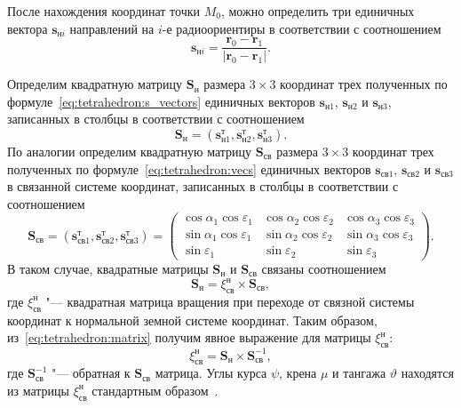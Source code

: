 \documentclass[../main.tex]{subfiles}
\begin{document}
После нахождения координат точки $M_0$, можно определить три единичных вектора $\mathbf{s}_{\text{н}i}$ направлений на $i$-е радиоориентиры в соответствии с соотношением
\begin{equation} \label{eq:tetrahedron:s_vectors}
    \mathbf{s}_{\text{н}i} = \frac{\mathbf{r}_0 - \mathbf{r}_1}{|\mathbf{r}_0 - \mathbf{r}_1|}.
\end{equation}

Определим квадратную матрицу $\mathbf{S}_{\text{н}}$ размера $3 \times 3$ координат трех полученных по формуле~\eqref{eq:tetrahedron:s_vectors} единичных векторов $\mathbf{s}_{\text{н}1}$, $\mathbf{s}_{\text{н}2}$ и $\mathbf{s}_{\text{н}3}$, записанных в столбцы в соответствии с соотношением
\begin{equation*}
    \mathbf{S}_{\text{н}} = \left(\mathbf{s}_{\text{н}1}^\text{т}, \mathbf{s}_{\text{н}2}^\text{т}, \mathbf{s}_{\text{н}3}^\text{т}\right).
\end{equation*}
По аналогии определим квадратную матрицу $\mathbf{S}_{\text{св}}$ размера $3 \times 3$ координат трех полученных по формуле~\eqref{eq:tetrahedron:vecs} единичных векторов $\mathbf{s}_{\text{св}1}$, $\mathbf{s}_{\text{св}2}$ и $\mathbf{s}_{\text{св}3}$ в связанной системе координат, записанных в столбцы в соответствии с соотношением
\begin{equation*}
    \mathbf{S}_{\text{св}} = \left(\mathbf{s}_{\text{св}1}^\text{т}, \mathbf{s}_{\text{св}2}^\text{т}, \mathbf{s}_{\text{св}3}^\text{т}\right) =
    \left(\begin{matrix}
      \cos\alpha_1\cos\varepsilon_1 & \cos\alpha_2\cos\varepsilon_2 & \cos\alpha_3 \cos\varepsilon_3 \\
      \sin\alpha_1\cos\varepsilon_1 & \sin\alpha_2\cos\varepsilon_2 & \sin\alpha_3 \cos\varepsilon_3 \\
      \sin\varepsilon_1 & \sin\varepsilon_2 & \sin\varepsilon_3
    \end{matrix}\right).
\end{equation*}
В таком случае, квадратные матрицы $\mathbf{S}_{\text{н}}$ и $\mathbf{S}_{\text{св}}$ связаны соотношением
\begin{equation}\label{eq:tetrahedron:matrix}
    \mathbf{S}_{\text{н}} = \xi_{\text{св}}^{\text{н}} \times \mathbf{S}_{\text{св}},
\end{equation}
где $\xi_{\text{св}}^{\text{н}}$ "--- квадратная матрица вращения при переходе от связной системы координат к нормальной земной системе координат. Таким образом, из~\eqref{eq:tetrahedron:matrix} получим явное выражение для матрицы $\xi_{\text{св}}^{\text{н}}$:
\begin{equation*}
    \xi_{\text{св}}^{\text{н}} = \mathbf{S}_{\text{н}} \times \mathbf{S}_{\text{св}}^{-1},
\end{equation*}
где $\mathbf{S}_{\text{св}}^{-1}$ "--- обратная к $\mathbf{S}_{\text{св}}$ матрица. Углы курса $\psi$, крена $\mu$ и тангажа $\vartheta$ находятся из матрицы $\xi_{\text{св}}^{\text{н}}$ стандартным образом~\cite{KOSTRIKIN:2008,ILIYN:2007}.
\end{document}
